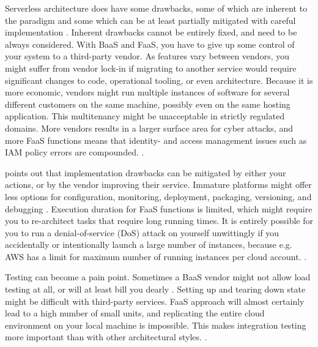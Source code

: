\documentclass[utf8,english]{gradu3}
\begin{document}
Serverless architecture does have some drawbacks, some of which are inherent to
the paradigm and some which can be at least partially mitigated with careful
implementation \parencite{Roberts2018}. Inherent drawbacks cannot be
entirely fixed, and need to be always considered. With BaaS and FaaS, you have
to give up some control of your system to a third-party vendor. As features vary
between vendors, you might suffer from vendor lock-in if migrating to another
service would require significant changes to code, operational tooling, or even
architecture. Because it is more economic, vendors might run multiple instances
of software for several different customers on the same machine, possibly even
on the same hosting application. This multitenancy might be unacceptable in
strictly regulated domains. More vendors results in a larger surface area for
cyber attacks, and more FaaS functions means that identity- and access
management issues such as IAM policy errors are compounded.
\parencite{Roberts2018}.

\textcite{Roberts2018} points out that implementation drawbacks can be
mitigated by either your actions, or by the vendor improving their service.
Immature platforms might offer less options for configuration, monitoring,
deployment, packaging, versioning, and debugging \parencite{Roberts2018}.
Execution duration for FaaS functions is limited, which might require you to
re-architect tasks that require long running times. It is entirely possible for
you to run a denial-of-service (DoS) attack on yourself unwittingly if
you accidentally or intentionally launch a large number of instances, because
e.g.  AWS has a limit for maximum number of running instances per cloud account.
\parencite{Roberts2018}.

Testing can become a pain point. Sometimes a BaaS vendor might not allow load
testing at all, or will at least bill you dearly \parencite{Roberts2018}.
Setting up and tearing down state might be difficult with third-party services.
FaaS approach will almost certainly lead to a high number of small units, and
replicating the entire cloud environment on your local machine is impossible. This
makes integration testing more important than with other architectural styles.
\parencite{Roberts2018}.
\end{document}
